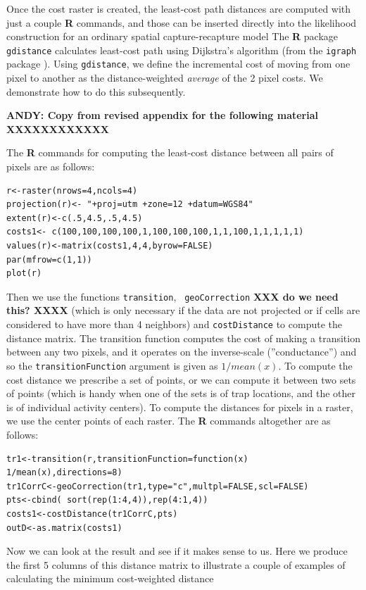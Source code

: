 Once the cost raster is created, the least-cost path distances are
computed with just a couple {\bf R} commands, and those can be
inserted directly into the likelihood construction for an ordinary
spatial capture-recapture model The {\bf R} package
\mbox{\tt gdistance} calculates least-cost path using  Dijkstra's algorithm
\citep{dijkstra:1959} (from the \mbox{\tt igraph} package
\citep{csardi:2010}).  Using \mbox{\tt gdistance}, we 
define the incremental cost of moving from one pixel to another as the
distance-weighted {\it average} of the 2 pixel costs. We demonstrate
how to do this subsequently.

{\bf ANDY: Copy from revised appendix for the following material
  XXXXXXXXXXXX}

The {\bf R} commands for computing the least-cost distance between all pairs of pixels
are as follows:
\begin{verbatim}
r<-raster(nrows=4,ncols=4)
projection(r)<- "+proj=utm +zone=12 +datum=WGS84"
extent(r)<-c(.5,4.5,.5,4.5)
costs1<- c(100,100,100,100,1,100,100,100,1,1,100,1,1,1,1,1)
values(r)<-matrix(costs1,4,4,byrow=FALSE)
par(mfrow=c(1,1))
plot(r)
\end{verbatim}
Then we use the functions \mbox{\tt transition}, \mbox{\tt
  geoCorrection} {\bf XXX do we need this? XXXX}
 (which is only necessary if the data are not
projected or if cells are considered to have more than 4 neighbors)
 and \mbox{\tt costDistance} to compute the distance
matrix. The transition function computes the cost of making a
transition between
any two pixels, and it operates on the inverse-scale (''conductance'')
and so the
\mbox{\tt transitionFunction} argument is given as $1/mean(x)$.
To compute the cost distance we prescribe a set of points, or  we
can compute it  between
two sets of points (which is handy when one of the sets is of trap
locations, and the other is of individual activity centers).
To compute the distances for pixels in a raster,
we use the center points of each raster.  The {\bf R}
 commands altogether are as follows:
{\small
\begin{verbatim}
tr1<-transition(r,transitionFunction=function(x) 1/mean(x),directions=8)
tr1CorrC<-geoCorrection(tr1,type="c",multpl=FALSE,scl=FALSE)
pts<-cbind( sort(rep(1:4,4)),rep(4:1,4))
costs1<-costDistance(tr1CorrC,pts)
outD<-as.matrix(costs1)
\end{verbatim}
}
Now we can look at the result and see if it makes sense to us. Here we
produce the first 5 columns of this distance matrix to illustrate a
couple of examples of calculating the minimum cost-weighted distance
